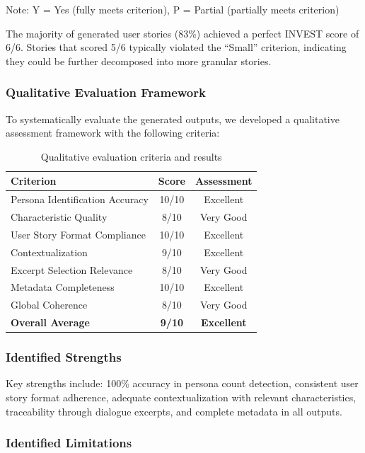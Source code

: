 \documentclass[12pt]{article}
\begin{document}
Note: Y = Yes (fully meets criterion), P = Partial (partially meets criterion)

The majority of generated user stories (83\%) achieved a perfect INVEST score of 6/6. Stories that scored 5/6 typically violated the ``Small'' criterion, indicating they could be further decomposed into more granular stories.

\subsubsection{Qualitative Evaluation Framework}

To systematically evaluate the generated outputs, we developed a qualitative assessment framework with the following criteria:

\begin{table}[H]
\centering
\caption{Qualitative evaluation criteria and results}
\label{tab:qualitative_eval}
\begin{tabular}{lcc}
\toprule
\textbf{Criterion} & \textbf{Score} & \textbf{Assessment} \\
\midrule
Persona Identification Accuracy & 10/10 & Excellent \\
Characteristic Quality & 8/10 & Very Good \\
User Story Format Compliance & 10/10 & Excellent \\
Contextualization & 9/10 & Excellent \\
Excerpt Selection Relevance & 8/10 & Very Good \\
Metadata Completeness & 10/10 & Excellent \\
Global Coherence & 8/10 & Very Good \\
\midrule
\textbf{Overall Average} & \textbf{9/10} & \textbf{Excellent} \\
\bottomrule
\end{tabular}
\end{table}

\subsubsection{Identified Strengths}

Key strengths include: 100\% accuracy in persona count detection, consistent user story format adherence, adequate contextualization with relevant characteristics, traceability through dialogue excerpts, and complete metadata in all outputs.

\subsubsection{Identified Limitations}
\end{document}
